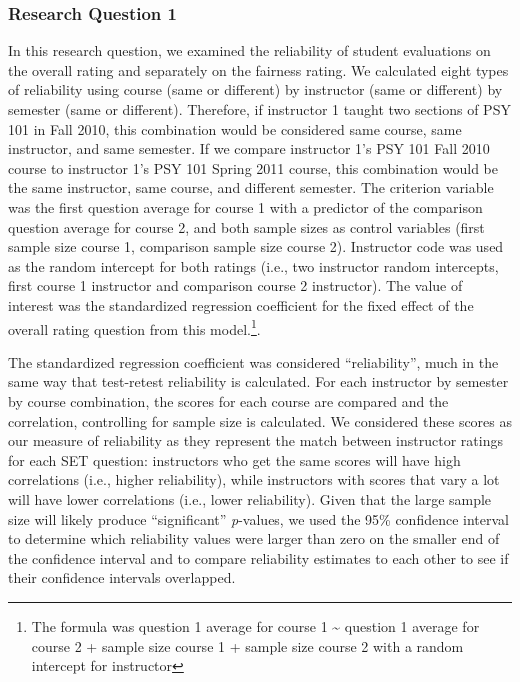 \documentclass[
  man]{apa7}
\begin{document}
\subsubsection{Research Question 1}\label{research-question-1}

In this research question, we examined the reliability of student
evaluations on the overall rating and separately on the fairness rating.
We calculated eight types of reliability using course (same or
different) by instructor (same or different) by semester (same or
different). Therefore, if instructor 1 taught two sections of PSY 101 in
Fall 2010, this combination would be considered same course, same
instructor, and same semester. If we compare instructor 1's PSY 101 Fall
2010 course to instructor 1's PSY 101 Spring 2011 course, this
combination would be the same instructor, same course, and different
semester. The criterion variable was the first question
average for course 1 with a predictor of the comparison question average
for course 2, and both sample sizes as control variables (first sample
size course 1, comparison sample size course 2). Instructor code was
used as the random intercept for both ratings (i.e., two instructor
random intercepts, first course 1 instructor and comparison course 2
instructor). The value of interest was the standardized regression coefficient for the fixed effect of the overall rating question from this model.\footnote{The
  formula was question 1 average for course 1 \textasciitilde{} question 1 average for
  course 2 + sample size course 1 + sample size course 2 with a random
  intercept for instructor}.

The standardized regression coefficient was considered ``reliability'',
much in the same way that test-retest reliability is calculated. For
each instructor by semester by course combination, the scores for each
course are compared and the correlation, controlling for sample size is
calculated. We considered these scores as our measure of reliability as
they represent the match between instructor ratings for each SET
question: instructors who get the same scores will have high correlations (i.e., higher reliability), while instructors with scores that vary a lot will have lower correlations (i.e., lower reliability). Given that the large sample size will likely produce
``significant'' \emph{p}-values, we used the 95\% confidence interval to
determine which reliability values were larger than zero on the smaller
end of the confidence interval and to compare reliability estimates to
each other to see if their confidence intervals overlapped.
\end{document}
